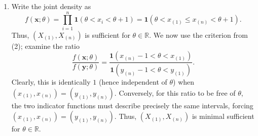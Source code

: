 \documentclass[11pt]{article}
\newcommand{\R}{\mathbb{R}}
\begin{document}
\begin{enumerate}
\begin{enumerate}
            \item Write the joint density as \[
                f(\bm{x}; \theta)
                    = \prod_{i = 1}^n \bm{1}(\theta < x_i < \theta + 1)
                    = \bm{1}(\theta < x_{(1)} \leq x_{(n)} < \theta + 1).
            \] Thus, $(X_{(1)}, X_{(n)})$ is sufficient for $\theta \in \R$.
            We now use the criterion from (2); examine the ratio \[
                \frac{f(\bm{x}; \theta)}{f(\bm{y}; \theta)}
                    = \frac{\bm{1}(x_{(n)} - 1 < \theta < x_{(1)})}{\bm{1}(y_{(n)} - 1 < \theta < y_{(1)})}.
            \] Clearly, this is identically $1$ (hence independent of
            $\theta$) when $(x_{(1)}, x_{(n)}) = (y_{(1)}, y_{(n)})$.
            Conversely, for this ratio to be free of $\theta$, the two
            indicator functions must describe precisely the same intervals,
            forcing $(x_{(1)}, x_{(n)}) = (y_{(1)}, y_{(n)})$.
            Thus, $(X_{(1)}, X_{(n)})$ is minimal sufficient for $\theta \in
            \R$.


\end{enumerate}
\end{enumerate}
\end{document}
